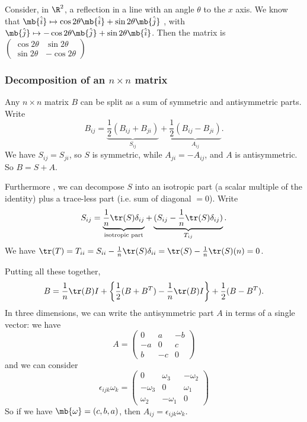 \documentclass[a4paper]{article}
\begin{document}
\begin{eg}
  Consider, in $\R^2$, a reflection in a line with an angle $\theta$ to the $x$ axis. We know that $\mb{\hat{i}}\mapsto \cos 2\theta \mb{\hat{i}} + \sin 2\theta\mb{\hat j}$ , with $\mb{\hat{j}}\mapsto -\cos 2\theta \mb{\hat{j}} + \sin 2\theta\mb{\hat i}$. Then the matrix is
$\begin{pmatrix}
    \cos 2\theta & \sin 2\theta\\
    \sin 2\theta & -\cos 2\theta
  \end{pmatrix}$
\end{eg}

\subsubsection{Decomposition of an \texorpdfstring{$n\times n$}{n x n} matrix}
  Any $n\times n$ matrix $B$ can be split as a sum of symmetric and antisymmetric parts. Write
\[
B_{ij} = \underbrace{\frac{1}{2}(B_{ij} + B_{ji})}_{S_{ij}} + \underbrace{\frac{1}{2}(B_{ij} - B_{ji})}_{A_{ij}}.
\]
We have $S_{ij} = S_{ji}$, so $S$ is symmetric, while $A_{ji} = -A_{ij}$, and $A$ is antisymmetric. So $B = S + A$.

Furthermore , we can decompose $S$ into an isotropic part (a scalar multiple of the identity) plus a trace-less part (i.e. sum of diagonal $= 0$). Write
\[
S_{ij} = \underbrace{\frac{1}{n}\tr (S)\delta_{ij}}_{\text{isotropic part}} + \underbrace{(S_{ij} - \frac{1}{n}\tr(S)\delta_{ij})}_{T_{ij}}.
\]
We have $\tr(T) = T_{ii} = S_{ii} - \frac{1}{n}\tr(S)\delta_{ii} = \tr(S) - \frac{1}{n}\tr(S)(n) = 0$.

Putting all these together,
\[
B = \frac{1}{n}\tr(B)I + \left\{\frac{1}{2}(B + B^T) - \frac{1}{n}\tr(B)I\right\} + \frac{1}{2}(B - B^T).
\]
In three dimensions, we can write the antisymmetric part $A$ in terms of a single vector: we have
\[
A = \begin{pmatrix}
  0 & a & -b\\
  -a & 0 & c\\
  b & -c & 0
\end{pmatrix}
\]
and we can consider
\[
\epsilon_{ijk}\omega_k =
\begin{pmatrix}
  0 & \omega_3 & -\omega_2\\
  -\omega_3 & 0 & \omega_1\\
  \omega_2 & -\omega_1 & 0
\end{pmatrix}
\]
So if we have $\mb{\omega} = (c, b, a)$, then $A_{ij} = \epsilon_{ijk}\omega_k$.
\end{document}
